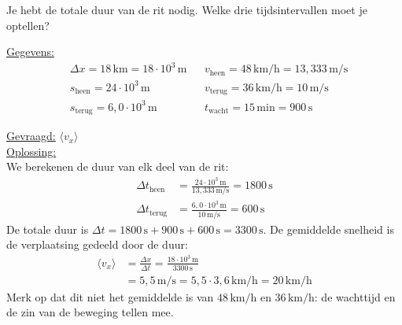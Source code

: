 \documentclass{ximera}
\begin{document}
\begin{exercise}
\begin{question}
        \begin{hint}
            Je hebt de totale duur van de rit nodig. Welke drie tijdsintervallen moet je optellen?
        \end{hint}

        \begin{solution}\nl
            \underline{Gegevens:}
            \begin{align*}
                & \Delta x = 18 \, \mathrm{km} = 18 \cdot 10^{3} \, \mathrm{m} & & v_{\text{heen}} = 48 \, \mathrm{km/h} = 13{,}333 \, \mathrm{m/s}\\
                & s_{\text{heen}} = 24 \cdot 10^{3} \, \mathrm{m} & & v_{\text{terug}} = 36 \, \mathrm{km/h} = 10 \, \mathrm{m/s}\\
                & s_{\text{terug}} = 6{,}0 \cdot 10^{3} \, \mathrm{m} & & t_{\text{wacht}} = 15 \, \mathrm{min} = 900 \, \mathrm{s}
            \end{align*}

            \underline{Gevraagd:} $\langle v_x \rangle$\\

            \underline{Oplossing:}\\
            We berekenen de duur van elk deel van de rit:
            \begin{align*}
                \Delta t_{\text{heen}} &= \frac{24 \cdot 10^{3} \, \mathrm{m}}{13{,}333 \, \mathrm{m/s}} = 1800 \, \mathrm{s}\\
                \Delta t_{\text{terug}} &= \frac{6{,}0 \cdot 10^{3} \, \mathrm{m}}{10 \, \mathrm{m/s}} = 600 \, \mathrm{s}
            \end{align*}
            De totale duur is $\Delta t = 1800 \, \mathrm{s} + 900 \, \mathrm{s} + 600 \, \mathrm{s} = 3300 \, \mathrm{s}$. De gemiddelde snelheid is de verplaatsing gedeeld door de duur:
            \begin{align*}
                \langle v_x \rangle &= \frac{\Delta x}{\Delta t} = \frac{18 \cdot 10^{3} \, \mathrm{m}}{3300 \, \mathrm{s}}\\
                &= \boxed{5{,}5 \, \mathrm{m/s}} = 5{,}5 \cdot 3{,}6 \, \mathrm{km/h} = \boxed{20 \, \mathrm{km/h}}
            \end{align*}
            Merk op dat dit niet het gemiddelde is van $48 \, \mathrm{km/h}$ en $36 \, \mathrm{km/h}$: de wachttijd en de zin van de beweging tellen mee.
        \end{solution}
    \end{question}


\end{exercise}
\end{document}
